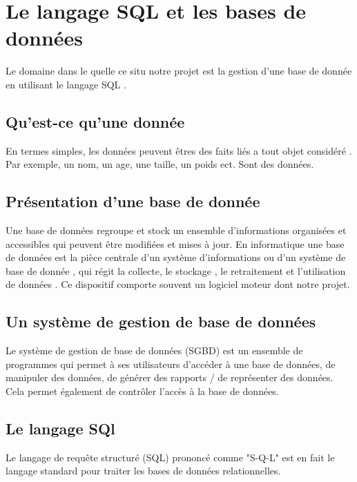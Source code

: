 \documentclass[oneside,13pt,a4paper]{report}
\begin{document}

    \chapter{Le langage SQL et les bases de données}
    
        Le domaine dans le quelle ce situ notre projet est la gestion d’une base de donnée en utilisant le langage SQL . 

        \section{Qu’est-ce qu’une donnée}

            En termes simples, les données peuvent êtres des faits liés a tout objet considéré .
            Par exemple, un nom, un age, une taille, un poids ect. Sont des données.

        \section{Présentation d’une base de donnée}

            Une base de données regroupe et stock un ensemble d’informations organisées et accessibles qui peuvent être modifiées et mises à jour. En informatique une base de données est la pièce centrale d’un système d’informations ou d’un système de base de donnée , qui régit la collecte, le stockage , le retraitement et l’utilisation de données . Ce dispositif comporte souvent un logiciel moteur dont notre projet.

        \section{Un système de gestion de base de données}

            Le système de gestion de base de données (SGBD) est un ensemble de programmes qui permet à ses utilisateurs d'accéder à une base de données, de manipuler des données, de générer des rapports / de représenter des données.
            Cela permet également de contrôler l'accès à la base de données.

        \section{Le langage SQl}

            Le langage de requête structuré (SQL) prononcé comme "S-Q-L" est en fait le langage standard pour traiter les bases de données relationnelles.
\end{document}
